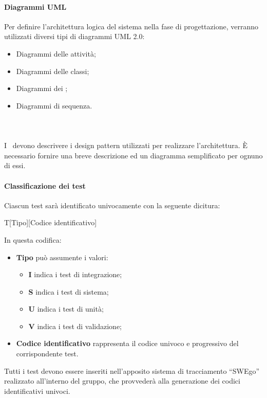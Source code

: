 \documentclass[../NormeDiProgetto.tex]{subfiles}
\begin{document}
			\paragraph{Diagrammi UML\\}
				Per definire l'architettura logica del sistema nella fase di progettazione,
				verranno utilizzati	diversi tipi di diagrammi UML 2.0:
				\begin{itemize}
					\item Diagrammi delle attività;
					\item Diagrammi delle classi;
					\item Diagrammi dei ;
					\item Diagrammi di sequenza.
				\end{itemize}
			\paragraph{\\}
				I \progettisti\ devono descrivere i design pattern utilizzati per realizzare l'architettura.
				È necessario fornire una breve descrizione ed un diagramma semplificato per ognuno di essi.
			\paragraph{Classificazione dei test\\}
				Ciascun test sarà identificato univocamente con la seguente dicitura:
				\begin{center}
					T[Tipo][Codice identificativo]
				\end{center}
				In questa codifica:
				\begin{itemize}
					\item \textbf{Tipo} può assumente i valori:
					\begin{itemize}
						\item \textbf{I} indica i test di integrazione;
						\item \textbf{S} indica i test di sistema;
						\item \textbf{U} indica i test di unità;
						\item \textbf{V} indica i test di validazione;
					\end{itemize}
					\item \textbf{Codice identificativo} rappresenta il codice univoco e progressivo del
					corrispondente test.
				\end{itemize}
				Tutti i test devono essere inseriti nell'apposito sistema di tracciamento ``SWEgo''
				realizzato all'interno del gruppo, che provvederà alla generazione
				dei codici identificativi univoci.
\end{document}
